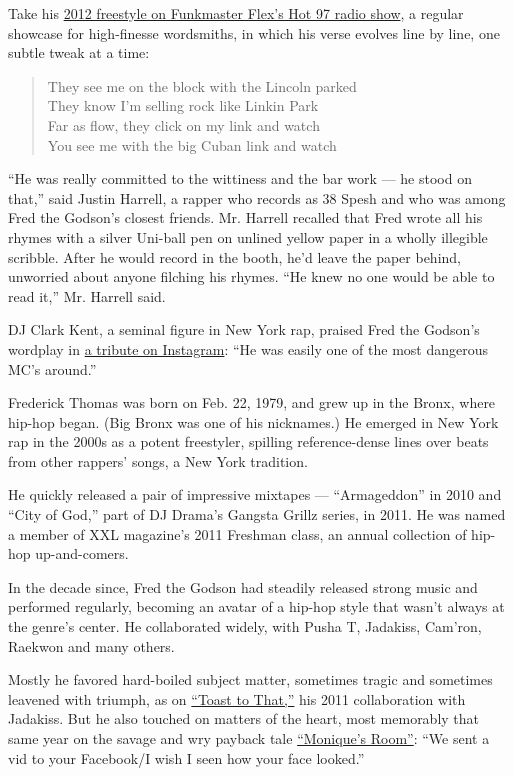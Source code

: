 Take his \href{https://www.youtube.com/watch?v=WQG9ODOy7Tc}{2012
freestyle on Funkmaster Flex's Hot 97 radio show}, a regular showcase
for high-finesse wordsmiths, in which his verse evolves line by line,
one subtle tweak at a time:

\begin{quote}
They see me on the block with the Lincoln parked\\
They know I'm selling rock like Linkin Park\\
Far as flow, they click on my link and watch\\
You see me with the big Cuban link and watch
\end{quote}

``He was really committed to the wittiness and the bar work --- he stood
on that,'' said Justin Harrell, a rapper who records as 38 Spesh and who
was among Fred the Godson's closest friends. Mr. Harrell recalled that
Fred wrote all his rhymes with a silver Uni-ball pen on unlined yellow
paper in a wholly illegible scribble. After he would record in the
booth, he'd leave the paper behind, unworried about anyone filching his
rhymes. ``He knew no one would be able to read it,'' Mr. Harrell said.

DJ Clark Kent, a seminal figure in New York rap, praised Fred the
Godson's wordplay in
\href{https://www.instagram.com/p/B_VUNUUg4Vv/?igshid=1y1xwgyxf139}{a
tribute on Instagram}: ``He was easily one of the most dangerous MC's
around.''

Frederick Thomas was born on Feb. 22, 1979, and grew up in the Bronx,
where hip-hop began. (Big Bronx was one of his nicknames.) He emerged in
New York rap in the 2000s as a potent freestyler, spilling
reference-dense lines over beats from other rappers' songs, a New York
tradition.

He quickly released a pair of impressive mixtapes --- ``Armageddon'' in
2010 and ``City of God,'' part of DJ Drama's Gangsta Grillz series, in
2011. He was named a member of XXL magazine's 2011 Freshman class, an
annual collection of hip-hop up-and-comers.

In the decade since, Fred the Godson had steadily released strong music
and performed regularly, becoming an avatar of a hip-hop style that
wasn't always at the genre's center. He collaborated widely, with Pusha
T, Jadakiss, Cam'ron, Raekwon and many others.

Mostly he favored hard-boiled subject matter, sometimes tragic and
sometimes leavened with triumph, as on
\href{https://www.youtube.com/watch?v=_neGwF5zM64}{``Toast to That,''}
his 2011 collaboration with Jadakiss. But he also touched on matters of
the heart, most memorably that same year on the savage and wry payback
tale \href{https://www.youtube.com/watch?v=yG_BquIbm1M}{``Monique's
Room''}: ``We sent a vid to your Facebook/I wish I seen how your face
looked.''

